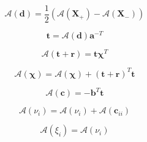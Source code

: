 \begin{equation}
\mathcal{A}(\mathbf{d}) = \frac{1}{2} (\mathcal{A}(\mathbf{X}_{+}) - \mathcal{A}(\mathbf{X}_{-}))
\label{eq:eigen_problem-invert_reduction_of_order-adjoint_of_tangent_linear-d_a}
\end{equation}

\begin{equation}
\mathbf{t} = \mathcal{A}(\mathbf{d})\mathbf{a}^{-T}
\label{eq:eigen_problem-invert_reduction_of_order-adjoint_of_tangent_linear-t}
\end{equation}

\begin{equation}
\mathcal{A}(\mathbf{t} + \mathbf{r}) = \mathbf{t}\boldsymbol{\chi}^{T}
\label{eq:eigen_problem-invert_reduction_of_order-adjoint_of_tangent_linear-tpr_a}
\end{equation}

\begin{equation}
\mathcal{A}(\boldsymbol{\chi}) = \mathcal{A}(\boldsymbol{\chi}) + (\mathbf{t} + \mathbf{r})^{T}\mathbf{t}
\label{eq:eigen_problem-invert_reduction_of_order-adjoint_of_tangent_linear-chi_a2}
\end{equation}

\begin{equation}
\mathcal{A}(\mathbf{c}) = -\mathbf{b}^{T}\mathbf{t}
\label{eq:eigen_problem-invert_reduction_of_order-adjoint_of_tangent_linear-c_a}
\end{equation}

\begin{equation}
\mathcal{A}(\nu_{i}) = \mathcal{A}(\nu_{i}) + \mathcal{A}(\mathbf{c}_{ii})
\label{eq:eigen_problem-invert_reduction_of_order-adjoint_of_tangent_linear-nu_a}
\end{equation}

\begin{equation}
\mathcal{A}(\xi_{i}) = \mathcal{A}(\nu_{i})
\label{eq:eigen_problem-invert_reduction_of_order-adjoint_of_tangent_linear-lambda_a}
\end{equation}
